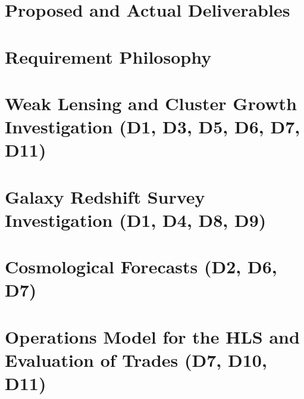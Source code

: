 \documentclass[letter]{ar-1col_WFIRST-HLS}
\begin{document}
\section{Proposed and Actual Deliverables}
\label{sec:deliverables}


\section{Requirement Philosophy}
\label{sec:reqt_philosophy}


\section{Weak Lensing and Cluster Growth Investigation (D1, D3, D5, D6, D7, D11)}
\label{sec:wl_gal-clusters}


\section{Galaxy Redshift Survey Investigation (D1, D4, D8, D9)}
\label{sec:gc}


\section{Cosmological Forecasts (D2, D6, D7)}
\label{sec:forecast}


\section{Operations Model for the HLS and Evaluation of Trades (D7, D10, D11)}
\label{sec:operation}

\end{document}
